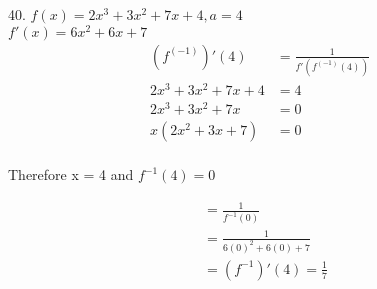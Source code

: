 \documentclass[letterpaper, 12pt]{article}
\begin{document}
40. $f(x)= 2x^{3} + 3x^{2} + 7x + 4, a = 4$\\
$f'(x) = 6x^{2}	+ 6x + 7$\\
\begin{align*}
	(f^(-1))'(4) &= \frac{1}{f'(f^(-1)(4))}\\
	2x^{3} + 3x^{2}	+7x + 4 &=  4\\
	2x^{3} +3x^{2}	+7x &=  0\\
	x(2x^{2} + 3x + 7) &= 0\\
\end{align*}

Therefore x = 4 and $f^{-1}(4) = 0$

\begin{align*}
&= \frac{1}{f^{-1}(0)}\\
&= \frac{1}{6(0)^{2}+6(0)+7}\\
&= (f^{-1})'(4)=\frac{1}{7}
\end{align*}
\end{document}
